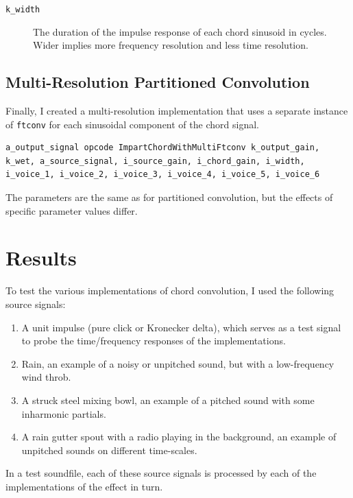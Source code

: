 \documentclass[runningheads,a4paper]{llncs}
\begin{document}
\begin{description}
 \item[\texttt{k\_width}] The duration of the impulse response of each chord 
sinusoid in cycles. Wider implies more frequency resolution and less time 
resolution.
\end{description}

\subsection{Multi-Resolution Partitioned Convolution}

Finally, I created a multi-resolution implementation that uses a separate 
instance of \texttt{ftconv} for each sinusoidal component of the chord signal.

\begin{lstlisting}
a_output_signal opcode ImpartChordWithMultiFtconv k_output_gain, 
k_wet, a_source_signal, i_source_gain, i_chord_gain, i_width, 
i_voice_1, i_voice_2, i_voice_3, i_voice_4, i_voice_5, i_voice_6 
\end{lstlisting}

\noindent The parameters are the same as for partitioned convolution, but the 
effects of specific parameter values differ.

\section{Results}

To test the various implementations of chord convolution, I used the following 
source signals:

\begin{enumerate}
 \item A unit impulse (pure click or Kronecker delta), which serves as a test 
signal to probe the time/frequency responses of the implementations.
 \item Rain, an example of a noisy or unpitched sound, but with a 
low-frequency wind throb.
 \item A struck steel mixing bowl, an example of a pitched sound with some 
inharmonic partials.
 \item A rain gutter spout with a radio playing in the background, an example 
of unpitched sounds on different time-scales.
\end{enumerate}

\noindent In a test soundfile, each of these source signals is processed by 
each of the implementations of the effect in turn. 
\end{document}
